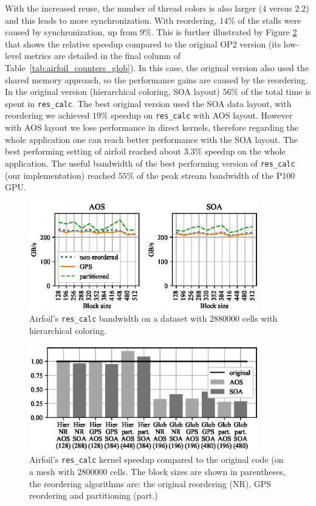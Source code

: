 With the increased reuse, the number of thread colors is also larger ($4$
versus $2.2$) and this leads to more synchronization. With reordering, $14\%$
of the stalls were caused by synchronization, up from $9\%$. This is further 
illustrated by Figure \ref{fig:airfoil_speedup_large} that shows the relative 
speedup compared to the original OP2 version (its low-level metrics are detailed 
in the final column of Table~\ref{tab:airfoil_counters_glob}). In this case, the 
original version also used the shared memory approach, so the performance gains 
are caused by the reordering. In the original version (hierarchical coloring, SOA
layout) $56\%$ of the total time is spent in \texttt{res\_calc}. The best original
version used the SOA data layout, with reordering we achieved $19\%$ speedup on
\texttt{res\_calc} with AOS layout.
However with AOS layout we lose performance in direct kernels, therefore regarding
the whole application one can reach better performance with the SOA layout.
The best performing setting of airfoil reached about $3.3\%$ speedup on the whole 
application. The useful bandwidth of the best performing version of 
\texttt{res\_calc} (our implementation) reached $55\%$ of the peak stream bandwidth
of the P100 GPU. 


\begin{figure}[Htbp]
\centering
\includegraphics[width=10cm]{fig/airfoil_bw-vs-bs_hier_large.eps}
\caption{Airfoil's \texttt{res\_calc} bandwidth on a dataset with $2880000$ 
cells with hierarchical coloring.}
\label{fig:airfoil_bw-vs-bs_hier_large}
\end{figure}

\begin{figure}[Htbp]
\centering
\includegraphics[width=10cm]{fig/airfoil_speedup_large.eps}
\caption{Airfoil's \texttt{res\_calc} kernel speedup compared to the original 
code (on a mesh with $2800000$ cells. The block sizes are shown in parentheses, 
the reordering algorithms are: the original reordering (NR), GPS reordering and 
partitioning (part.)}
\label{fig:airfoil_speedup_large}
\end{figure}



